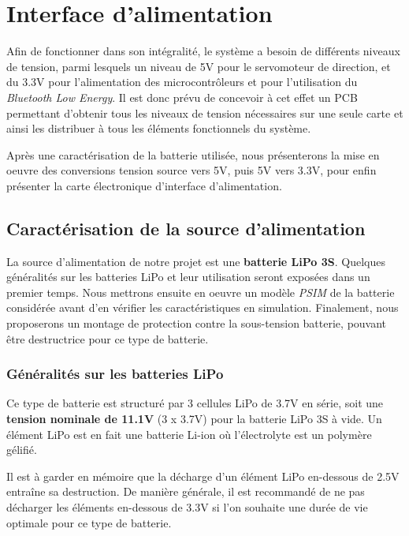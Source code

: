 \documentclass[a4paper,12pt]{book}
\begin{document}
	

	\chapter{Interface d'alimentation}
		
	Afin de fonctionner dans son intégralité, le système a besoin de différents niveaux de tension, parmi lesquels un niveau de 5V pour le servomoteur de direction, et du 3.3V pour l'alimentation des microcontrôleurs et pour l'utilisation du \textit{Bluetooth Low Energy}. Il est donc prévu de concevoir à cet effet un PCB permettant d'obtenir tous les niveaux de tension nécessaires sur une seule carte et ainsi les distribuer à tous les éléments fonctionnels du système. 
	
	Après une caractérisation de la batterie utilisée, nous présenterons la mise en oeuvre des conversions tension source vers 5V, puis 5V vers 3.3V, pour enfin présenter la carte électronique d'interface d'alimentation.
		
		\section{Caractérisation de la source d'alimentation}
			
		La source d'alimentation de notre projet est une \textbf{batterie LiPo 3S}. Quelques généralités sur les batteries LiPo et leur utilisation seront exposées dans un premier temps. Nous mettrons ensuite en oeuvre un modèle \textit{PSIM} de la batterie considérée avant d'en vérifier les caractéristiques en simulation. Finalement, nous proposerons un montage de protection contre la sous-tension batterie, pouvant être destructrice pour ce type de batterie.
		
			\subsection{Généralités sur les batteries LiPo}
			
			Ce type de batterie est structuré par 3 cellules LiPo de 3.7V en série, soit une \textbf{tension nominale de 11.1V} (3 x 3.7V) pour la batterie LiPo 3S à vide. Un élément LiPo est en fait une batterie Li-ion où l'électrolyte est un polymère gélifié.
			
		Il est à garder en mémoire que la décharge d'un élément LiPo en-dessous de 2.5V entraîne sa destruction. De manière générale, il est recommandé de ne pas décharger les éléments en-dessous de 3.3V si l'on souhaite une durée de vie optimale pour ce type de batterie. 
			
\end{document}
